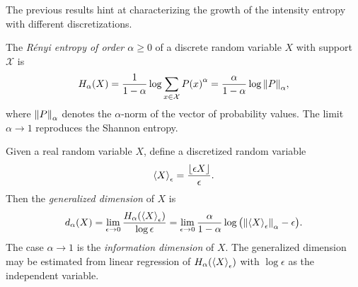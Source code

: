 \documentclass[../notebook.tex]{subfiles}
\begin{document}

The previous results hint at characterizing the growth of the intensity entropy
with different discretizations.

\begin{defn}
  The \emph{R\'enyi entropy of order $\alpha \ge 0$} of a discrete random
  variable $X$ with support $\mathcal{X}$ is
  \begin{equation}
    H_\alpha(X)
    = \frac{1}{1 - \alpha}\operatorname{\mathrm{log}}\sum_{x \in \mathcal{X}} {P(x)}^\alpha
    = \frac{\alpha}{1 - \alpha}\operatorname{\mathrm{log}}\norm{P}_\alpha,
    \label{eq:renyi}
  \end{equation}
  where $\norm{P}_\alpha$ denotes the $\alpha$-norm of the vector of probability
  values. The limit $\alpha \to 1$ reproduces the Shannon entropy.
\end{defn}

\begin{defn}
  Given a real random variable $X$, define a discretized random variable
  \[
    \ev{X}_\epsilon
    = \frac{\lfloor\epsilon X\rfloor}{\epsilon}.
  \]
  Then the \emph{generalized dimension} of $X$ is
  \begin{equation}
    d_\alpha(X)
    = \lim_{\epsilon \to 0} \frac{H_\alpha(\ev{X}_\epsilon)}{\log \epsilon}
    = \lim_{\epsilon \to 0} \frac{\alpha}{1 - \alpha}
    \log\qty(\norm{\ev{X}_\epsilon}_\alpha - \epsilon).
    \label{eq:gendim}
  \end{equation}
  The case $\alpha \to 1$ is the \emph{information dimension} of $X$. The
  generalized dimension may be estimated from linear regression of
  $H_\alpha(\ev{X}_\epsilon)$ with $\log\epsilon$ as the independent variable.
\end{defn}


\end{document}
